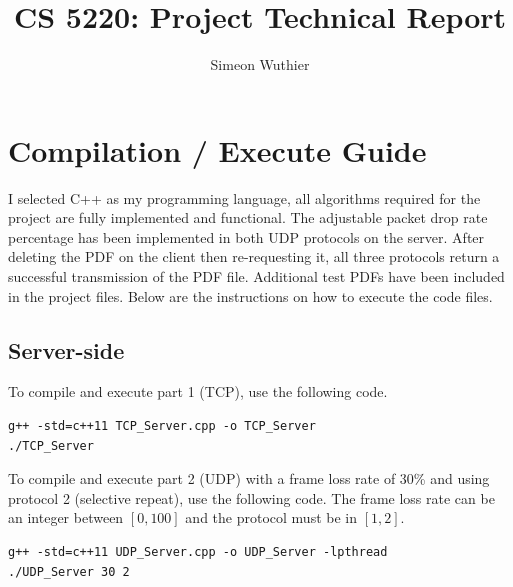 \documentclass[runningheads]{llncs}
\begin{document}
\title{CS 5220: Project Technical Report}

\author{Simeon Wuthier}
%


\maketitle

\section{Compilation / Execute Guide}
I selected C++ as my programming language, all algorithms required for the project are fully implemented and functional. The adjustable packet drop rate percentage has been implemented in both UDP protocols on the server. After deleting the PDF on the client then re-requesting it, all three protocols return a successful transmission of the PDF file. Additional test PDFs have been included in the project files. Below are the instructions on how to execute the code files.

\subsection{Server-side}
To compile and execute part 1 (TCP), use the following code.

\begin{lstlisting}
g++ -std=c++11 TCP_Server.cpp -o TCP_Server
./TCP_Server
\end{lstlisting}

To compile and execute part 2 (UDP) with a frame loss rate of 30\% and using protocol 2 (selective repeat), use the following code. The frame loss rate can be an integer between $[0, 100]$ and the protocol must be in $[1, 2]$.

\begin{lstlisting}
g++ -std=c++11 UDP_Server.cpp -o UDP_Server -lpthread
./UDP_Server 30 2
\end{lstlisting}
\end{document}
